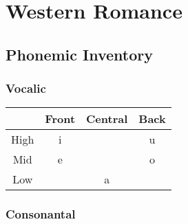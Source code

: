 \documentclass{report}
\begin{document}


\chapter{Western Romance}


\section{Phonemic Inventory}

\subsection{Vocalic}

\begin{tcolorbox}[title=Western Romance Monophthongs, hbox]
  \begin{tabular}{|c|c|c|c|}
    \hline
    & Front & Central & Back \\
    \hline
    High & i & & u \\
    \hline
    Mid & e & & o \\
    \hline
    Low & & a & \\
    \hline
  \end{tabular}
\end{tcolorbox}

\subsection{Consonantal}
\end{document}

